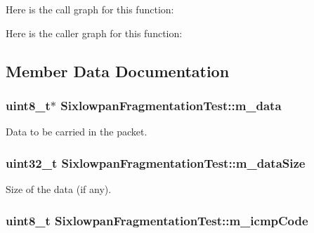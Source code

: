 Here is the call graph for this function\+:




Here is the caller graph for this function\+:




\subsection{Member Data Documentation}
\subsubsection[{\texorpdfstring{m\+\_\+data}{m_data}}]{\setlength{\rightskip}{0pt plus 5cm}uint8\+\_\+t$\ast$ Sixlowpan\+Fragmentation\+Test\+::m\+\_\+data\hspace{0.3cm}{\ttfamily [private]}}\hypertarget{classSixlowpanFragmentationTest_afba3c6fb71866d031b594068f548207f}{}\label{classSixlowpanFragmentationTest_afba3c6fb71866d031b594068f548207f}


Data to be carried in the packet. 

\subsubsection[{\texorpdfstring{m\+\_\+data\+Size}{m_dataSize}}]{\setlength{\rightskip}{0pt plus 5cm}uint32\+\_\+t Sixlowpan\+Fragmentation\+Test\+::m\+\_\+data\+Size\hspace{0.3cm}{\ttfamily [private]}}\hypertarget{classSixlowpanFragmentationTest_a9abb242135d4b3661d3d04d11202c03d}{}\label{classSixlowpanFragmentationTest_a9abb242135d4b3661d3d04d11202c03d}


Size of the data (if any). 

\subsubsection[{\texorpdfstring{m\+\_\+icmp\+Code}{m_icmpCode}}]{\setlength{\rightskip}{0pt plus 5cm}uint8\+\_\+t Sixlowpan\+Fragmentation\+Test\+::m\+\_\+icmp\+Code\hspace{0.3cm}{\ttfamily [private]}}\hypertarget{classSixlowpanFragmentationTest_a4fe3e1f6ca813a3972b675c4250eb154}{}\label{classSixlowpanFragmentationTest_a4fe3e1f6ca813a3972b675c4250eb154}


